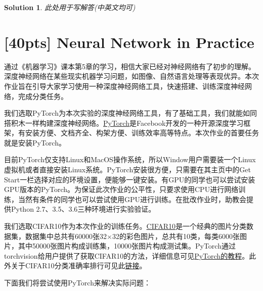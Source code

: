 \documentclass[a4paper,UTF8]{article}
\numberwithin{equation}{section}
\newtheorem*{solution}{Solution}
\begin{document}
 \begin{solution}
	此处用于写解答(中英文均可)
 \end{solution}
\newpage

\section{[40pts] Neural Network in Practice}
通过《机器学习》课本第5章的学习，相信大家已经对神经网络有了初步的理解。深度神经网络在某些现实机器学习问题，如图像、自然语言处理等表现优异。本次作业旨在引导大家学习使用一种深度神经网络工具，快速搭建、训练深度神经网络，完成分类任务。

我们选取PyTorch为本次实验的深度神经网络工具，有了基础工具，我们就能如同搭积木一样构建深度神经网络。\href{http://pytorch.org/}{PyTorch}是Facebook开发的一种开源深度学习框架，有安装方便、文档齐全、构架方便、训练效率高等特点。本次作业的首要任务就是安装PyTorch。

目前PyTorch仅支持Linux和MacOS操作系统，所以Window用户需要装一个Linux虚拟机或者直接安装Linux系统。PyTorch安装很方便，只需要在其主页中的Get Start一栏选择对应的环境设置，便能够一键安装。有GPU的同学也可以尝试安装GPU版本的PyTorch。为保证此次作业的公平性，只要求使用CPU进行网络训练，当然有条件的同学也可以尝试使用GPU进行训练。在批改作业时，助教会提供Python 2.7、3.5、3.6三种环境进行实验验证。

我们选取CIFAR10作为本次作业的训练任务。\href{https://en.wikipedia.org/wiki/CIFAR-10}{CIFAR10}是一个经典的图片分类数据集，数据集中总共有60000张32$\times$32的彩色图片，总共有10类，每类6000张图片，其中50000张图片构成训练集，10000张图片构成测试集。PyTorch通过torchvision给用户提供了获取CIFAR10的方法，详细信息可见\href{http://pytorch.org/tutorials/beginner/blitz/cifar10_tutorial.html}{PyTorch的教程}。此外关于CIFAR10分类准确率排行可见此\href{http://rodrigob.github.io/are_we_there_yet/build/classification_datasets_results.html}{链接}。

下面我们将尝试使用PyTorch来解决实际问题：
\end{document}
